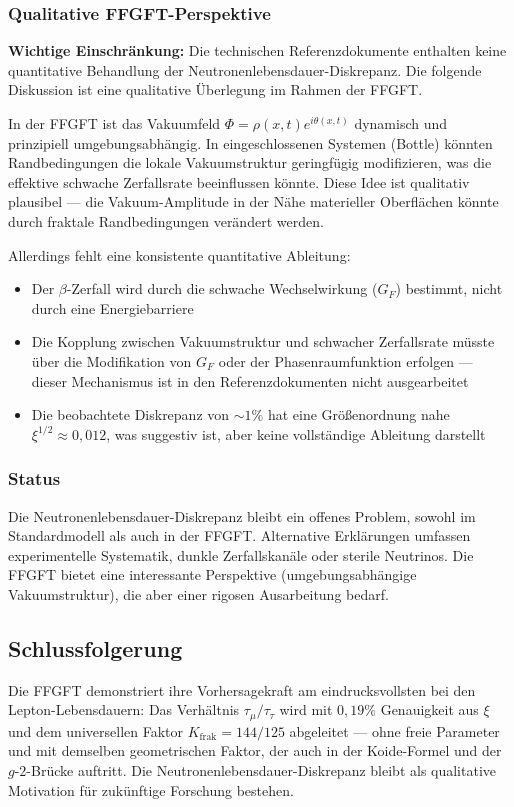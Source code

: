 	\subsubsection*{Qualitative FFGFT-Perspektive}
	
	\textbf{Wichtige Einschränkung:} Die technischen Referenzdokumente enthalten keine quantitative Behandlung der Neutronenlebensdauer-Diskrepanz. Die folgende Diskussion ist eine qualitative Überlegung im Rahmen der FFGFT.
	
	In der FFGFT ist das Vakuumfeld \(\Phi = \rho(x,t)e^{i\theta(x,t)}\) dynamisch und prinzipiell umgebungsabhängig. In eingeschlossenen Systemen (Bottle) könnten Randbedingungen die lokale Vakuumstruktur geringfügig modifizieren, was die effektive schwache Zerfallsrate beeinflussen könnte. Diese Idee ist qualitativ plausibel — die Vakuum-Amplitude in der Nähe materieller Oberflächen könnte durch fraktale Randbedingungen verändert werden.
	
	Allerdings fehlt eine konsistente quantitative Ableitung:
	
	\begin{itemize}
		\item Der \(\beta\)-Zerfall wird durch die schwache Wechselwirkung (\(G_F\)) bestimmt, nicht durch eine Energiebarriere
		\item Die Kopplung zwischen Vakuumstruktur und schwacher Zerfallsrate müsste über die Modifikation von \(G_F\) oder der Phasenraumfunktion erfolgen — dieser Mechanismus ist in den Referenzdokumenten nicht ausgearbeitet
		\item Die beobachtete Diskrepanz von \(\sim 1\%\) hat eine Größenordnung nahe \(\xi^{1/2} \approx 0{,}012\), was suggestiv ist, aber keine vollständige Ableitung darstellt
	\end{itemize}
	
	\subsubsection*{Status}
	
	Die Neutronenlebensdauer-Diskrepanz bleibt ein offenes Problem, sowohl im Standardmodell als auch in der FFGFT. Alternative Erklärungen umfassen experimentelle Systematik, dunkle Zerfallskanäle oder sterile Neutrinos. Die FFGFT bietet eine interessante Perspektive (umgebungsabhängige Vakuumstruktur), die aber einer rigosen Ausarbeitung bedarf.
	
	\subsection*{Schlussfolgerung}
	
	Die FFGFT demonstriert ihre Vorhersagekraft am eindrucksvollsten bei den Lepton-Lebensdauern: Das Verhältnis \(\tau_\mu/\tau_\tau\) wird mit \(0{,}19\%\) Genauigkeit aus \(\xi\) und dem universellen Faktor \(K_\text{frak} = 144/125\) abgeleitet — ohne freie Parameter und mit demselben geometrischen Faktor, der auch in der Koide-Formel und der \(g\)-\(2\)-Brücke auftritt. Die Neutronenlebensdauer-Diskrepanz bleibt als qualitative Motivation für zukünftige Forschung bestehen.


